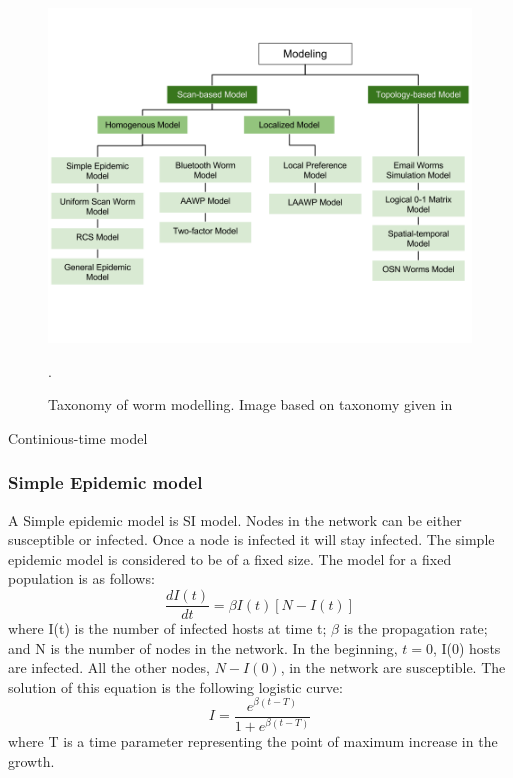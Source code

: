 \begin{figure}
\centering
\includegraphics[scale=0.4]{Images/tabel3.png} 
\caption{Taxonomy of worm modelling. Image based on taxonomy given in \cite{wang2014modeling}}.
\label{ShapeUp}
\end{figure}
Continious-time model
\subsubsection{Simple Epidemic model}
A Simple epidemic model is SI model. Nodes in the network can be either susceptible or infected.
Once a node is infected it will stay infected. 
The simple epidemic model is considered to be of a fixed size. The model for a fixed population is as follows:
\begin{equation}
\dfrac{d I(t)}{dt} = \beta I(t)[N-I(t)]
\end{equation} 
where I(t) is the number of infected hosts at time t; $\beta$ is the propagation rate; and N is the number of nodes in the network. In the beginning, $t=0$, I(0) hosts are infected. All the other nodes, $N - I(0)$, in the network are susceptible. 
The solution of this equation is the following logistic curve:
\begin{equation}
I = \dfrac{e^{\beta(t-T)}}{1+e^{\beta(t-T)}}
\end{equation}
where T is a time parameter representing the point of maximum increase in the
growth.\\


